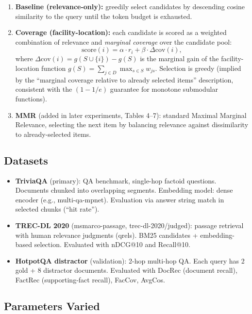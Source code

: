 \documentclass[11pt,a4paper]{article}
\begin{document}
\begin{enumerate}[leftmargin=*]
	\item \textbf{Baseline (relevance-only):} greedily select candidates by descending cosine similarity to the query until the token budget is exhausted.
	\item \textbf{Coverage (facility-location):} each candidate is scored as a weighted combination of relevance and \emph{marginal coverage} over the candidate pool:
	      \[
		      \text{score}(i) = \alpha \cdot r_i + \beta \cdot \Delta\text{cov}(i),
	      \]
	      where $\Delta\text{cov}(i) = g(S \cup \{i\}) - g(S)$ is the marginal gain of the facility-location function
	      $g(S) = \sum_{j \in D} \max_{s \in S} w_{js}$.
	      Selection is greedy (implied by the ``marginal coverage relative to already selected items'' description, consistent with the $(1-1/e)$ guarantee for monotone submodular functions).
	\item \textbf{MMR} (added in later experiments, Tables 4--7): standard Maximal Marginal Relevance, selecting the next item by balancing relevance against dissimilarity to already-selected items.
\end{enumerate}

\subsection{Datasets}

\begin{itemize}[leftmargin=*]
	\item \textbf{TriviaQA} (primary): QA benchmark, single-hop factoid questions. Documents chunked into overlapping segments. Embedding model: dense encoder (e.g., multi-qa-mpnet). Evaluation via answer string match in selected chunks (``hit rate'').
	\item \textbf{TREC-DL 2020} (msmarco-passage, trec-dl-2020/judged): passage retrieval with human relevance judgments (qrels). BM25 candidates + embedding-based selection. Evaluated with nDCG@10 and Recall@10.
	\item \textbf{HotpotQA distractor} (validation): 2-hop multi-hop QA. Each query has 2 gold + 8 distractor documents. Evaluated with DocRec (document recall), FactRec (supporting-fact recall), FacCov, AvgCos.
\end{itemize}

\subsection{Parameters Varied}
\end{document}
